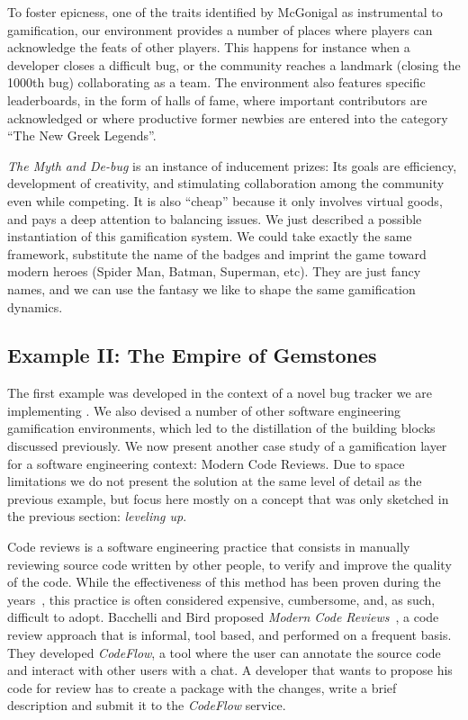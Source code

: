To foster epicness, one of the traits identified by McGonigal as instrumental to gamification, our environment provides a number of places where players can acknowledge the feats of other players.
This happens for instance when a developer closes a difficult bug, or the community reaches a landmark (\eg closing the 1000th bug) collaborating as a team.
The environment also features specific leaderboards, in the form of halls of fame, where important contributors are acknowledged or where productive former newbies are entered into the category ``The New Greek Legends''.

\textit{The Myth and De-bug} is an instance of inducement prizes: Its goals are efficiency, development of creativity, and stimulating collaboration among the community even while competing.
It is also ``cheap'' because it only involves virtual goods, and pays a deep attention to balancing issues.
We just described a possible instantiation of this gamification system.
We could take exactly the same framework, substitute the name of the badges and imprint the game toward modern heroes (Spider Man, Batman, Superman, etc).
They are just fancy names, and we can use the fantasy we like to shape the same gamification dynamics.

\subsection{Example II: The Empire of Gemstones}\label{sec:example-gems}

The first example was developed in the context of a novel bug tracker we are implementing \cite{DalS2014a}.
We also devised a number of other software engineering gamification environments, which led to the distillation of the building blocks discussed previously.
We now present another case study of a gamification layer for a software engineering context: Modern Code Reviews.
Due to space limitations we do not present the solution at the same level of detail as the previous example, but focus here mostly on a concept that was only sketched in the previous section: \emph{leveling up}.

Code reviews is a software engineering practice that consists in manually reviewing source code written by other people, to verify and improve the quality of the code.
While the effectiveness of this method has been proven during the years~\cite{Shull2008a}, this practice is often considered expensive, cumbersome, and, as such, difficult to adopt.
Bacchelli and Bird proposed \textit{Modern Code Reviews}~\cite{Bacc2013a}, a code review approach that is informal, tool based, and performed on a frequent basis.
They developed \textit{CodeFlow}, a tool where the user can annotate the source code and interact with other users with a chat.
A developer that wants to propose his code for review has to create a package with the changes, write a brief description and submit it to the \textit{CodeFlow} service.

